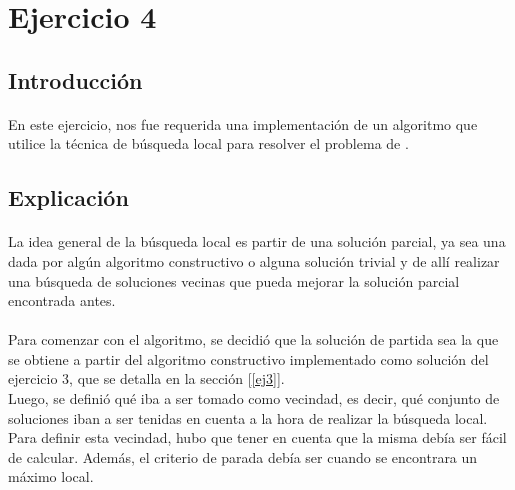 \section{Ejercicio 4}

\subsection{Introducción}
\paragraph{}
En este ejercicio, nos fue requerida una implementación de un algoritmo que utilice la técnica de búsqueda local para resolver el problema de \mc.

\subsection{Explicación}

\paragraph{}
La idea general de la búsqueda local es partir de una solución parcial, ya sea una dada por algún algoritmo constructivo o alguna solución trivial y de allí realizar una búsqueda de soluciones vecinas que pueda mejorar la solución parcial encontrada antes.

\paragraph{}
Para comenzar con el algoritmo, se decidió que la solución de partida sea la que se obtiene a partir del algoritmo constructivo implementado como solución del ejercicio 3, que se detalla en la sección [\ref{ej3}].\\
Luego, se definió qué iba a ser tomado como vecindad, es decir, qué conjunto de soluciones iban a ser tenidas en cuenta a la hora de realizar la búsqueda local. Para definir esta vecindad, hubo que tener en cuenta que la misma debía ser fácil de calcular. Además, el criterio de parada debía ser cuando se encontrara un máximo local.


